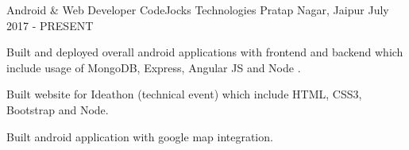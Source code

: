 

\begin{cventries}

  \cventry
    {Android \& Web Developer} %
    {CodeJocks Technologies} %
    {Pratap Nagar, Jaipur} %
    {July 2017 - PRESENT} %
    {
      \begin{cvitems} %
       \item {Built and deployed overall android applications with frontend and backend which include usage of MongoDB, Express, Angular JS and Node .}
        \item {Built website for Ideathon (technical event) which include HTML, CSS3, Bootstrap and Node.}
        \item {Built android application with google map integration.}
      \end{cvitems}
    }
\end{cventries}
